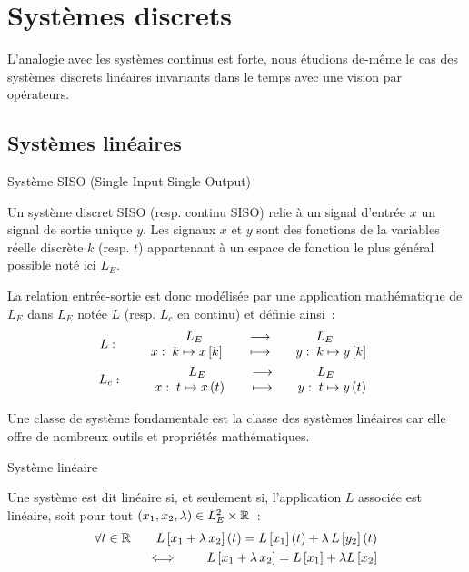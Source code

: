 \chapter{Systèmes discrets}


L'analogie avec les systèmes continus est forte, nous étudions de-même
le cas des systèmes discrets linéaires invariants dans le temps avec
une vision par opérateurs.


\section{Systèmes linéaires}

\begin{definition}{Système SISO (Single Input Single Output)}
  
  Un système discret SISO (resp. continu SISO) relie à un signal d'entrée $x$
  un signal de sortie unique $y$. Les signaux $x$ et $y$ sont des
  fonctions de la variables réelle discrète $k$ (resp. $t$) appartenant
  à un espace de fonction le plus général possible noté ici $L_E$.

  La relation entrée-sortie est donc modélisée par une application
  mathématique de $L_E$ dans $L_E$ notée $L$ (resp. $L_c$ en continu)
  et définie ainsi~:
  \begin{eqnarray}
    L : \qquad \begin{array}{ccc} L_E & \longrightarrow & L_E \\ x : \; k\mapsto x\left[k\right]\quad{} & \longmapsto & \quad y :\; k\mapsto y\left[k\right] \\ \end{array} \\
    L_c: \qquad \begin{array}{ccc} L_E & \longrightarrow & L_E \\ x : \; t\mapsto x\left(t\right)\quad{} & \longmapsto & \quad y :\; t\mapsto y\left(t\right) \\ \end{array} 
  \end{eqnarray}
\end{definition}

Une classe de système fondamentale est la classe des systèmes
linéaires car elle offre de nombreux outils et propriétés
mathématiques.

\begin{definition}{Système linéaire}
  \label{def:linearite}
  
  Une système est dit linéaire si, et seulement si, l'application $L$
  associée est linéaire, soit pour tout
  $\left(x_1,x_2,\lambda\right) \in L_E^2 \times \mathbb{R}$~:
  \begin{eqnarray}
    \label{eq:def_linearite}
    \forall t \in \mathbb{R} \qquad L\left[x_1 + \lambda\, x_2\right](t) = L\left[x_1\right](t) + \lambda\,L\left[y_2\right](t) \nonumber\\
    \iff \qquad L\left[x_1 + \lambda\,x_2\right] = L\left[x_1\right] +\lambda L\left[x_2 \right]
  \end{eqnarray}
\end{definition}

